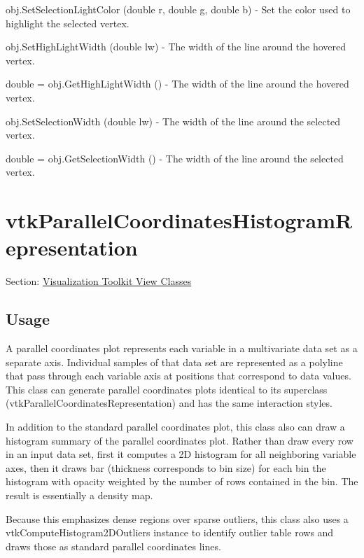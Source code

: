 \begin{DoxyItemize}
\item {\ttfamily obj.\-Set\-Selection\-Light\-Color (double r, double g, double b)} -\/ Set the color used to highlight the selected vertex.  
\item {\ttfamily obj.\-Set\-High\-Light\-Width (double lw)} -\/ The width of the line around the hovered vertex.  
\item {\ttfamily double = obj.\-Get\-High\-Light\-Width ()} -\/ The width of the line around the hovered vertex.  
\item {\ttfamily obj.\-Set\-Selection\-Width (double lw)} -\/ The width of the line around the selected vertex.  
\item {\ttfamily double = obj.\-Get\-Selection\-Width ()} -\/ The width of the line around the selected vertex.  
\end{DoxyItemize}\hypertarget{vtkviews_vtkparallelcoordinateshistogramrepresentation}{}\section{vtk\-Parallel\-Coordinates\-Histogram\-Representation}\label{vtkviews_vtkparallelcoordinateshistogramrepresentation}
Section\-: \hyperlink{sec_vtkviews}{Visualization Toolkit View Classes} \hypertarget{vtkwidgets_vtkxyplotwidget_Usage}{}\subsection{Usage}\label{vtkwidgets_vtkxyplotwidget_Usage}
A parallel coordinates plot represents each variable in a multivariate data set as a separate axis. Individual samples of that data set are represented as a polyline that pass through each variable axis at positions that correspond to data values. This class can generate parallel coordinates plots identical to its superclass (vtk\-Parallel\-Coordinates\-Representation) and has the same interaction styles.

In addition to the standard parallel coordinates plot, this class also can draw a histogram summary of the parallel coordinates plot. Rather than draw every row in an input data set, first it computes a 2\-D histogram for all neighboring variable axes, then it draws bar (thickness corresponds to bin size) for each bin the histogram with opacity weighted by the number of rows contained in the bin. The result is essentially a density map.

Because this emphasizes dense regions over sparse outliers, this class also uses a vtk\-Compute\-Histogram2\-D\-Outliers instance to identify outlier table rows and draws those as standard parallel coordinates lines.

